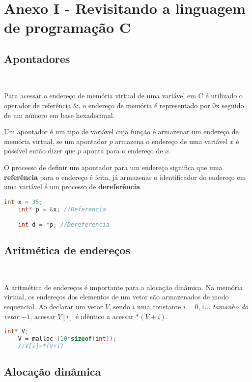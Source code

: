\section*{Anexo I - Revisitando a linguagem de programação C}
\subsection*{Apontadores}
\

Para acessar o endereço de memória virtual de uma variável em C é utilizado o operador de referência $\&$, o endereço de memória é representado por 0x seguido de um número em base hexadecimal.

Um apontador é um tipo de variável cuja função é armazenar um endereço de memória virtual, se um apontador $p$ armazena o endereço de uma variável $x$ é possível então dizer que $p$ aponta para o endereço de $x$.

O processo de definir um apontador para um endereço significa que uma \textbf{referência} para o endereço é feita, já armazenar o identificador do endereço em uma variável é um processo de \textbf{dereferência}.

\begin{lstlisting}[language=C, frame=single]
    int x = 35;
    int* p = &x; //Referencia

    int d = *p; //Dereferencia
\end{lstlisting}

\subsection*{Aritmética de endereços}
\

A aritmética de endereços é importante para a alocação dinâmica. Na memória virtual, os endereços dos elementos de um vetor são armazenados de modo sequencial. Ao declarar um vetor $V$, sendo $i$ uma constante $i=0, 1 ...$ \textit{tamanho do vetor} $-1$, acessar $V[i]$ é idêntico a acessar $*(V+i)$.

\begin{lstlisting}[language=C, frame=single]
    int* V; 
    V = malloc (10*sizeof(int));
    //V[i]=*(V+i)
\end{lstlisting}

\subsection*{Alocação dinâmica}
\

